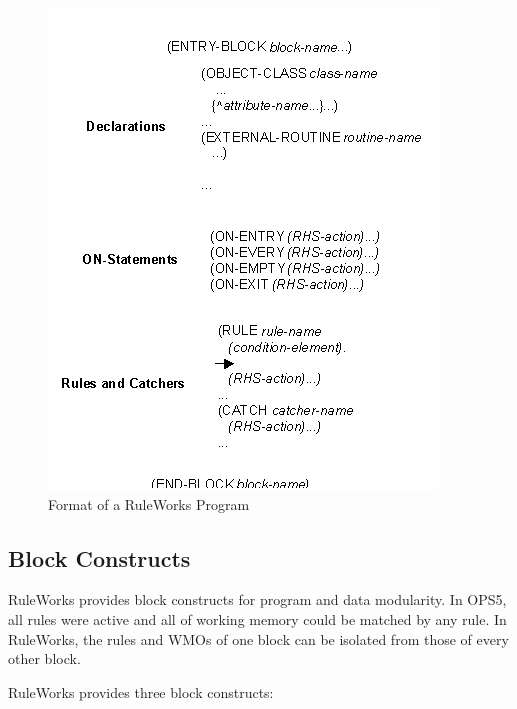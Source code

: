 \begin{figure}[h]
  \centering
  \includegraphics[scale=0.7]{f1-4}
  \caption{Format of a RuleWorks Program}
  \label{f:1-4}
\end{figure}

\subsection{Block Constructs}

RuleWorks provides block constructs for program and data
modularity. In OPS5, all rules were active and all of working memory
could be matched by any rule. In RuleWorks, the rules and WMOs of one
block can be isolated from those of every other block.

RuleWorks provides three block constructs:

